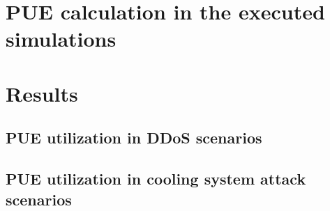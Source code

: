 \section{PUE calculation in the executed simulations}

\section{Results}

\subsection{PUE utilization in DDoS scenarios}

\subsection{PUE utilization in cooling system attack scenarios}

